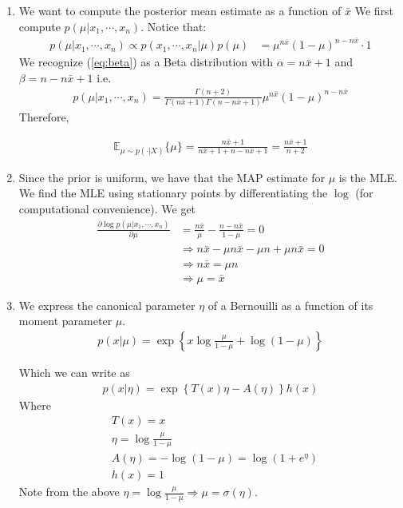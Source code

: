 \documentclass[paper=a4, fontsize=11pt]{scrartcl} %
\numberwithin{equation}{section} %
\numberwithin{figure}{section} %
\numberwithin{table}{section} %
\begin{document}
\begin{enumerate}
	\item We want to compute the posterior mean estimate as a function of $\bar{x}$
	We first compute $p(\mu | x_1, \cdots, x_n)$. Notice that:
	\begin{align}\label{eq:beta}
	p(\mu | x_1, \cdots, x_n) \propto p(x_1, \cdots, x_n | \mu)p(\mu) &= \mu^{n\bar{x}}(1-\mu)^{n-n\bar{x} }\cdot 1
	\end{align}
	We recognize (\ref{eq:beta}) as a Beta distribution with $\alpha = n\bar{x} + 1$ and $\beta = n - n\bar{x} + 1$ i.e.
	\begin{align}
	p(\mu | x_1, \cdots, x_n) = \frac{\Gamma(n+2)}{\Gamma(n \bar{x}+1)\Gamma(n - n \bar{x}+1)}\mu^{n\bar{x}}(1-\mu)^{n-n\bar{x}}
	\end{align}
	Therefore,
	
	\begin{align}
	\mathbb{E}_{\mu\sim p(\cdot | X)}\{\mu\} = \frac{n \bar{x}+1}{n \bar{x}+1 + n - n \bar{x}+1}=\frac{n \bar{x}+1}{n + 2}
	\end{align}
	
	\item Since the prior is uniform, we have that the MAP estimate for \(\mu\) is the MLE. We find the MLE using stationary points by differentiating the $\log$ (for computational convenience). We get
	\begin{align*}
	\frac{\partial \log p(\mu | x_1, \cdots, x_n)}{\partial \mu} &= \frac{n\bar{x}}{\mu} - \frac{n - n\bar{x}}{1-\mu} = 0\\
	&\Rightarrow n\bar{x} - \mu n\bar{x} - \mu n + \mu n\bar{x} = 0 \\
	&\Rightarrow n\bar{x} = \mu n \\
	&\Rightarrow \mu = \bar{x}
	\end{align*}
	
	\item We express the canonical parameter $\eta$ of a Bernouilli as a function of its moment parameter $\mu$.
	\begin{align}
	p(x| \mu) = \exp\left\{ x\log \frac{\mu}{1-\mu} + \log(1-\mu) \right\}
	\end{align}
	
	Which we can write as
	\begin{align}
	p(x| \eta) = \exp\left\{ T(x)\eta - A(\eta) \right\}h(x)
	\end{align}
	Where
	\begin{align*}
	&T(x)=x \\
	&\eta = \log \frac{\mu}{1-\mu} \\
	&A(\eta)=-\log(1-\mu)=\log(1+e^{\eta}) \\
	&h(x)=1
	\end{align*}
	Note from the above $\eta = \log \frac{\mu}{1-\mu} \Rightarrow \mu = \sigma(\eta)$. 
	

\end{enumerate}
\end{document}
